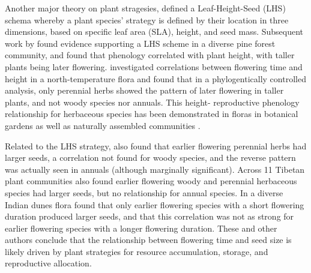 \documentclass[11pt]{article}
\begin{document}
Another major theory on plant stragesies, \citet{westoby1998leaf} defined a Leaf-Height-Seed (LHS) schema whereby a plant species’ strategy is defined by their location in three dimensions, based on specific leaf area (SLA), height, and seed mass. Subsequent work by \citet{laughlin2010multi} found evidence supporting a LHS scheme in a diverse pine forest community, and found that phenology correlated with plant height, with taller plants being later flowering. \citet{bolmgren2008time} investigated correlations between flowering time and height in a north-temperature flora and found that in a phylogentically controlled analysis, only perennial herbs showed the pattern of later flowering in taller plants, and not woody species nor annuals. This height- reproductive phenology relationship for herbaceous species has been demonstrated in floras in botanical gardens \citet{sporbert2022functional, horbach2023flowering} as well as naturally assembled communities \citep{du2010trade, liu2021linkage}.

Related to the LHS strategy, \citet{bolmgren2008time} also found that earlier flowering perennial herbs had larger seeds, a correlation not found for woody species, and the reverse pattern was actually seen in annuals (although marginally significant). Across 11 Tibetan plant communities \citet{du2010trade} also found earlier flowering woody and perennial herbaceous species had larger seeds, but no relationship for annual species. In a diverse Indian dunes flora \citet{mazer1990seed} found that only earlier flowering species with a short flowering duration produced larger seeds, and that this correlation was not as strong for earlier flowering species with a longer flowering duration. These and other authors conclude that the relationship between flowering time and seed size is likely driven by plant strategies for resource accumulation, storage, and reproductive allocation.
\end{document}
